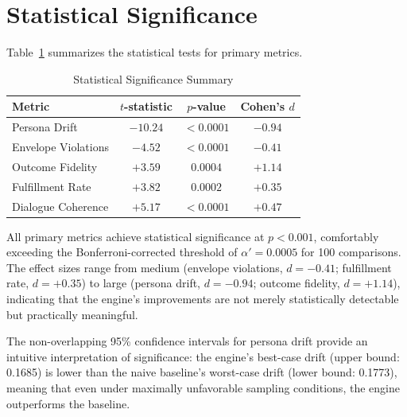 \section{Statistical Significance}

Table~\ref{tab:significance} summarizes the statistical tests for primary metrics.

\begin{table}[t]
\centering
\caption{Statistical Significance Summary}
\label{tab:significance}
\begin{tabular}{lccc}
\toprule
Metric & $t$-statistic & $p$-value & Cohen's $d$ \\
\midrule
Persona Drift        & $-10.24$ & $<0.0001$ & $-0.94$ \\
Envelope Violations  & $-4.52$  & $<0.0001$ & $-0.41$ \\
Outcome Fidelity     & $+3.59$  & $0.0004$  & $+1.14$ \\
Fulfillment Rate     & $+3.82$  & $0.0002$  & $+0.35$ \\
Dialogue Coherence   & $+5.17$  & $<0.0001$ & $+0.47$ \\
\bottomrule
\end{tabular}
\end{table}

All primary metrics achieve statistical significance at $p < 0.001$, comfortably exceeding the Bonferroni-corrected threshold of $\alpha' = 0.0005$ for 100 comparisons. The effect sizes range from medium (envelope violations, $d = -0.41$; fulfillment rate, $d = +0.35$) to large (persona drift, $d = -0.94$; outcome fidelity, $d = +1.14$), indicating that the engine's improvements are not merely statistically detectable but practically meaningful.

The non-overlapping 95\% confidence intervals for persona drift provide an intuitive interpretation of significance: the engine's best-case drift (upper bound: 0.1685) is lower than the naive baseline's worst-case drift (lower bound: 0.1773), meaning that even under maximally unfavorable sampling conditions, the engine outperforms the baseline.
